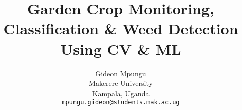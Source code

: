 \documentclass[10pt,twocolumn,letterpaper]{article}
\begin{document}
\title{Garden Crop Monitoring, Classification \& Weed Detection Using CV \& ML}

\author{Gideon Mpungu\\
Makerere University\\
Kampala, Uganda\\
{\tt\small mpungu.gideon@students.mak.ac.ug} 
}

\maketitle
\end{document}
